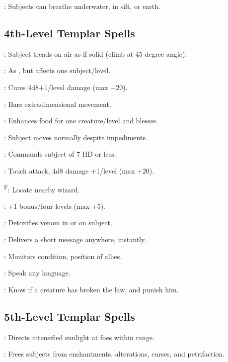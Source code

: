 : Subjects can breathe underwater, in silt, or earth.



\subsection{4th-Level Templar Spells}

: Subject treads on air as if solid (climb at 45-degree angle).

: As , but affects one subject/level.

: Cures 4d8+1/level damage (max +20).

: Bars extradimensional movement.

: Enhances food for one creature/level and blesses.

: Subject moves normally despite impediments.

: Commands subject of 7 HD or less.

: Touch attack, 4d8 damage +1/level (max +20).

\textsuperscript{F}: Locate nearby wizard.

: +1 bonus/four levels (max +5).

: Detoxifies venom in or on subject.

: Delivers a short message anywhere, instantly.

: Monitors condition, position of allies.

: Speak any language.

: Know if a creature has broken the law, and punish him.



\subsection{5th-Level Templar Spells}

: Directs intensified sunlight at foes within range.

: Frees subjects from enchantments, alterations, curses, and petrifaction.

